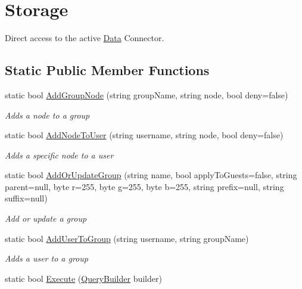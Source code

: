 \hypertarget{classOTA_1_1Data_1_1Storage}{}\section{Storage}
\label{classOTA_1_1Data_1_1Storage}


Direct access to the active \hyperlink{namespaceOTA_1_1Data}{Data} Connector.  


\subsection*{Static Public Member Functions}
\begin{DoxyCompactItemize}
\item 
static bool \hyperlink{classOTA_1_1Data_1_1Storage_ab3b86a9e0eba7c30a5f262ddf8705bad}{Add\+Group\+Node} (string group\+Name, string node, bool deny=false)
\begin{DoxyCompactList}\small\item\em Adds a node to a group \end{DoxyCompactList}\item 
static bool \hyperlink{classOTA_1_1Data_1_1Storage_ae0600889620e383d3e41f78d1660c50d}{Add\+Node\+To\+User} (string username, string node, bool deny=false)
\begin{DoxyCompactList}\small\item\em Adds a specific node to a user \end{DoxyCompactList}\item 
static bool \hyperlink{classOTA_1_1Data_1_1Storage_a6188ee1735a0ffeac15143956cecf97a}{Add\+Or\+Update\+Group} (string name, bool apply\+To\+Guests=false, string parent=null, byte r=255, byte g=255, byte b=255, string prefix=null, string suffix=null)
\begin{DoxyCompactList}\small\item\em Add or update a group \end{DoxyCompactList}\item 
static bool \hyperlink{classOTA_1_1Data_1_1Storage_a9c50ecc78f5836f3adf875088db4b1a6}{Add\+User\+To\+Group} (string username, string group\+Name)
\begin{DoxyCompactList}\small\item\em Adds a user to a group \end{DoxyCompactList}\item 
static bool \hyperlink{classOTA_1_1Data_1_1Storage_a9fccbe162c670b472f7f11963b669d81}{Execute} (\hyperlink{classOTA_1_1Data_1_1QueryBuilder}{Query\+Builder} builder)

\end{DoxyCompactItemize}
